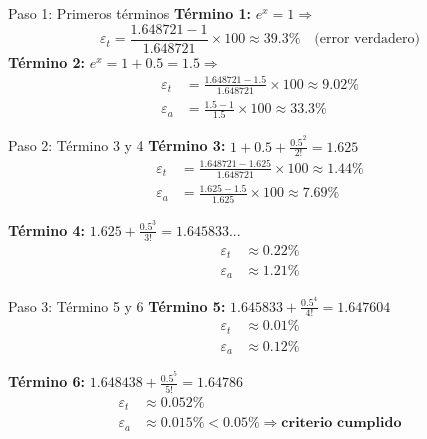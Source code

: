 \documentclass[main.tex]{subfiles}
\begin{document}
\begin{frame}[c]{Paso 1: Primeros términos}
\textbf{Término 1:} \( e^x = 1 \Rightarrow \)
\[
  \varepsilon_t = \frac{1.648721 - 1}{1.648721} \times 100 \approx 39.3\% \quad \text{(error verdadero)}
\]
\textbf{Término 2:} \( e^x = 1 + 0.5 = 1.5 \Rightarrow \)
\begin{align*}
  \varepsilon_t &= \frac{1.648721 - 1.5}{1.648721} \times 100 \approx 9.02\% \\
  \varepsilon_a &= \frac{1.5 - 1}{1.5} \times 100 \approx 33.3\%
\end{align*}
\end{frame}

\begin{frame}[c]{Paso 2: Término 3 y 4}
\textbf{Término 3:} \( 1 + 0.5 + \frac{0.5^2}{2!} = 1.625 \)
\begin{align*}
  \varepsilon_t &= \frac{1.648721 - 1.625}{1.648721} \times 100 \approx 1.44\% \\
  \varepsilon_a &= \frac{1.625 - 1.5}{1.625} \times 100 \approx 7.69\%
\end{align*}

\textbf{Término 4:} \( 1.625 + \frac{0.5^3}{3!} = 1.645833... \)
\begin{align*}
  \varepsilon_t &\approx 0.22\% \\
  \varepsilon_a &\approx 1.21\%
\end{align*}
\end{frame}

\begin{frame}[c]{Paso 3: Término 5 y 6}
\textbf{Término 5:} \( 1.645833 + \frac{0.5^4}{4!} = 1.647604 \)
\begin{align*}
  \varepsilon_t &\approx 0.01\% \\
  \varepsilon_a &\approx 0.12\%
\end{align*}

\textbf{Término 6:} \( 1.648438 + \frac{0.5^5}{5!} = 1.64786 \)
\begin{align*}
  \varepsilon_t &\approx 0.052\% \\
  \varepsilon_a &\approx 0.015\% < 0.05\% \Rightarrow \textbf{criterio cumplido}
\end{align*}
\end{frame}
\end{document}
